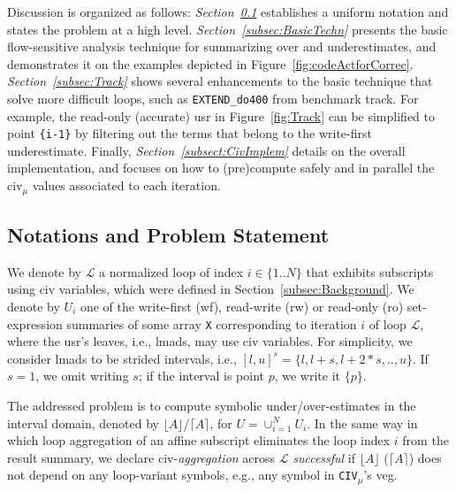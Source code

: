 \documentclass{sig-alternate}
\begin{document}
Discussion is organized as follows:
{\em Section~\ref{subsec:ProblemHL}} establishes a uniform notation and
states the problem at a high level.
%
{\em Section~\ref{subsec:BasicTechn}} presents the basic flow-sensitive 
analysis technique for summarizing over and underestimates, and 
demonstrates it on the examples depicted in 
Figure~\ref{fig:codeActforCorrec}.
%
{\em Section~\ref{subsec:Track}} shows several enhancements
to the basic technique that solve %
more difficult loops, such as {\tt EXTEND\_do400} from benchmark {\sc track}.
%
For example, the read-only (accurate) {\sc usr} in Figure~\ref{fig:Track}
can be simplified to point {\tt \{i-1\}} by filtering out the terms
that belong to the write-first underestimate.
%
Finally, {\em Section~\ref{subsect:CivImplem}} details on the overall 
implementation, and focuses on how to (pre)compute safely and in parallel 
the {\sc civ}$_\mu$ values associated to each iteration.


\subsection{Notations and Problem Statement}
\label{subsec:ProblemHL}

We denote by $\mathcal{L}$ a normalized loop of index $i\in\{1..N\}$ that
exhibits subscripts using {\sc civ} variables, which were defined
in Section~\ref{subsec:Background}. %
%
We denote by $U_i$ one of the write-first ({\sc wf}), read-write ({\sc rw})
or read-only ({\sc ro}) set-expression summaries of some array {\tt X} 
corresponding to iteration $i$ of loop $\mathcal{L}$, where the {\sc usr}'s 
leaves, i.e., {\sc lmad}s, may use {\sc civ} variables. 
%
For simplicity, we consider {\sc lmad}s to be 
strided intervals, i.e., $[l,u]^s=\{l, l+s, l+2*s, .., u\}$.
If $s=1$, we omit writing $s$; if the interval 
is point $p$, we write it $\{p\}$.
  

The addressed problem is to compute symbolic under/over-estimates in the 
interval domain, denoted by $\lfloor A \rfloor$/$\lceil A \rceil$, 
for $U = \cup_{i=1}^{N} U_i$.
%
In the same way in which loop aggregation of an affine subscript  
eliminates the loop index $i$ from the result summary,
we declare {\sc civ}-{\em aggregation} across $\mathcal{L}$ {\em successful} 
if $\lfloor A \rfloor$ ($\lceil A \rceil$) does not depend on any loop-variant
symbols, e.g., any symbol in {\tt CIV}$_{\mu}$'s  {\sc veg}. %
\end{document}
